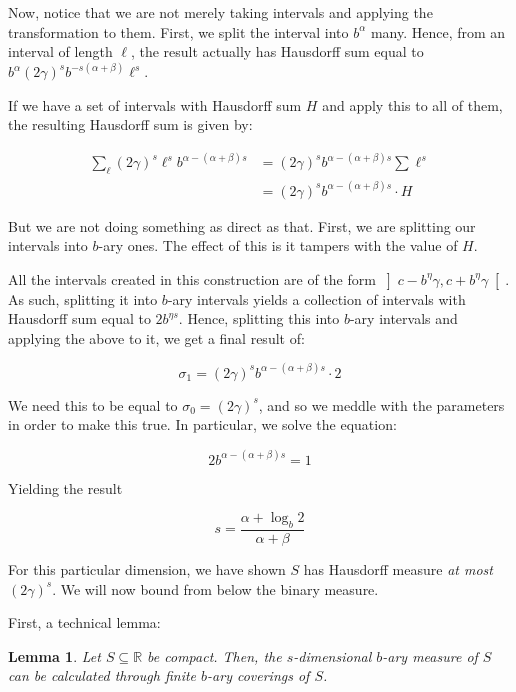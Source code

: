\documentclass[11pt, reqno]{amsart}
\newcommand{\R}{\mathbb{R}}
\newtheorem{lemma}{Lemma}
\begin{document}
Now, notice that we are not merely taking intervals and applying the transformation to them. First, we split the interval into $b^\alpha$ many. Hence, from an interval of length $\ell$, the result actually has Hausdorff sum equal to $b^\alpha (2 \gamma)^s b^{-s (\alpha + \beta)} \ell^s$.

If we have a set of intervals with Hausdorff sum $H$ and apply this to all of them, the resulting Hausdorff sum is given by:

\begin{align*}
\sum_\ell (2 \gamma)^s \ell^s b^{\alpha - (\alpha + \beta) s} &=
(2 \gamma)^s b^{\alpha - (\alpha + \beta) s} \sum \ell^s\\
&= (2 \gamma)^s b^{\alpha - (\alpha + \beta) s} \cdot H
\end{align*}

But we are not doing something as direct as that. First, we are splitting our intervals into $b$-ary ones. The effect of this is it tampers with the value of $H$.

All the intervals created in this construction are of the form $\left] c - b^\eta \gamma, c + b^\eta \gamma \right[$. As such, splitting it into $b$-ary intervals yields a collection of intervals with Hausdorff sum equal to $2 b^{\eta s}$. Hence, splitting this into $b$-ary intervals and applying the above to it, we get a final result of:

\[\sigma_1 = (2 \gamma)^s b^{\alpha - (\alpha + \beta) s} \cdot 2 \]

We need this to be equal to $\sigma_0 = (2 \gamma)^s$, and so we meddle with the parameters in order to make this true. In particular, we solve the equation:

\[ 2 b^{\alpha - (\alpha + \beta) s} = 1 \]

Yielding the result

\[s = \frac{\alpha + \log_b 2}{\alpha + \beta}\]

For this particular dimension, we have shown $S$ has Hausdorff measure \emph{at most} $(2 \gamma)^s$. We will now bound from below the binary measure.

First, a technical lemma:

\begin{lemma}
Let $S \subseteq \R$ be compact. Then, the $s$-dimensional $b$-ary measure of $S$ can be calculated through finite $b$-ary coverings of $S$.
\end{lemma}
\end{document}

